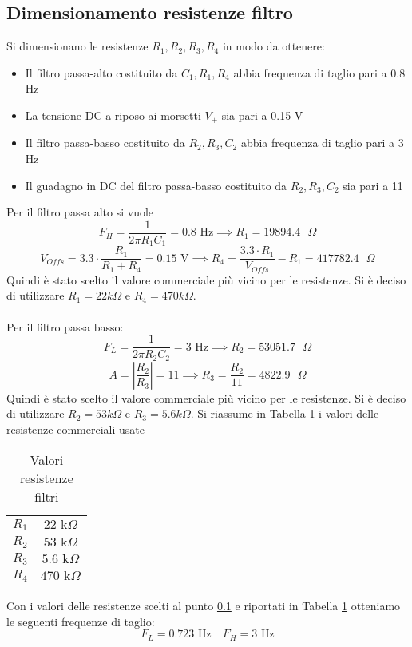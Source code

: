 \subsection{Dimensionamento resistenze filtro}\label{ch:dim}
Si dimensionano le resistenze $R_1, R_2, R_3, R_4$ in modo da ottenere:
\begin{itemize}
    \item Il filtro passa-alto costituito da $C_1, R_1, R_4$ abbia frequenza di taglio pari a 0.8 Hz
    \item La tensione DC a riposo ai morsetti $V_+$ sia pari a 0.15 V
    \item Il filtro passa-basso costituito da $R_2, R_3, C_2$ abbia frequenza di taglio pari a 3 Hz
    \item Il guadagno in DC del filtro passa-basso costituito da $R_2, R_3, C_2$ sia pari a 11   
\end{itemize}
\noindent Per il filtro passa alto si vuole 
\begin{equation}
    F_H=\frac{1}{2\pi R_1C_1}=0.8\text{ Hz}\implies R_1=19894.4\text{ }\Omega
\end{equation}
\begin{equation}
    V_{Offs}=3.3\cdot\frac{R_1}{R_1+R_4}=0.15\text{ V}\implies R_4=\frac{3.3\cdot R_1}{V_{Offs}}-R_1=417782.4\text{ }\Omega
\end{equation}
Quindi è stato scelto il valore commerciale più vicino per le resistenze. Si è deciso di utilizzare $R_1 = 22k\Omega$ e $R_4 = 470k\Omega$.\\\\
Per il filtro passa basso:
\begin{equation}
    F_L=\frac{1}{2\pi R_2C_2}=3\text{ Hz}\implies R_2 = 53051.7\text{ }\Omega
\end{equation}
\begin{equation}
    A=\left|\frac{R_2}{R_3}\right|=11\implies R_3=\frac{R_2}{11}=4822.9\text{ }\Omega
\end{equation}
Quindi è stato scelto il valore commerciale più vicino per le resistenze. Si è deciso di utilizzare $R_2 = 53k\Omega$ e $R_3 = 5.6k\Omega$.
Si riassume in Tabella \ref{tab:R-value} i valori delle resistenze commerciali usate
\begin{table}[H]
    \centering
    \begin{tabular}{|c|c|}
        \hline
        $R_1$&$22\text{ k}\Omega$\\\hline
        $R_2$&$53\text{ k}\Omega$\\\hline
        $R_3$&$5.6\text{ k}\Omega$\\\hline
        $R_4$&$470\text{ k}\Omega$\\\hline
    \end{tabular}
    \caption{Valori resistenze filtri}
    \label{tab:R-value}
\end{table}
Con i valori delle resistenze scelti al punto \ref{ch:dim} e riportati in Tabella \ref{tab:R-value} otteniamo le seguenti frequenze di taglio:
\begin{equation*}
    F_L=0.723\text{ Hz}\quad F_H=3\text{ Hz}
\end{equation*}
